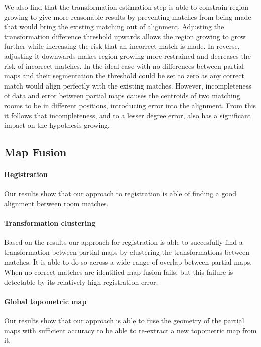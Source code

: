 We also find that the transformation estimation step is able to constrain region growing to give more reasonable results by preventing matches from being made that would bring the existing matching out of alignment. Adjusting the transformation difference threshold upwards allows the region growing to grow further while increasing the risk that an incorrect match is made. In reverse, adjusting it downwards makes region growing more restrained and decreases the risk of incorrect matches. In the ideal case with no differences between partial maps and their segmentation the threshold could be set to zero as any correct match would align perfectly with the existing matches. However, incompleteness of data and error between partial maps causes the centroids of two matching rooms to be in different positions, introducing error into the alignment. From this it follows that incompleteness, and to a lesser degree error, also has a significant impact on the hypothesis growing.


\subsection{Map Fusion}

\paragraph{Registration}
Our results show that our approach to registration is able of finding a good alignment between room matches. 

\paragraph{Transformation clustering}
Based on the results our approach for registration is able to succesfully find a transformation between partial maps by clustering the transformations between matches. It is able to do so across a wide range of overlap between partial maps. When no correct matches are identified map fusion fails, but this failure is detectable by its relatively high registration error.

\paragraph{Global topometric map}
Our results show that our approach is able to fuse the geometry of the partial maps with sufficient accuracy to be able to re-extract a new topometric map from it. 




